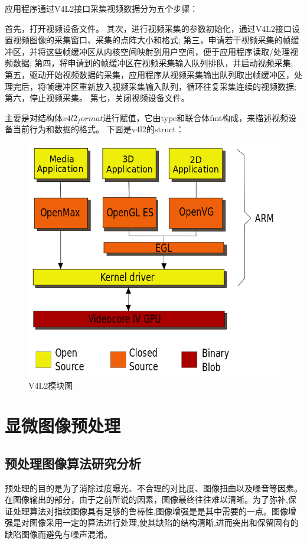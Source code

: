应用程序通过V4L2接口采集视频数据分为五个步骤：

首先，打开视频设备文件。
其次，进行视频采集的参数初始化，通过V4L2接口设置视频图像的采集窗口、采集的点阵大小和格式;
第三，申请若干视频采集的帧缓冲区，并将这些帧缓冲区从内核空间映射到用户空间，便于应用程序读取/处理视频数据;
第四，将申请到的帧缓冲区在视频采集输入队列排队，并启动视频采集;
第五，驱动开始视频数据的采集，应用程序从视频采集输出队列取出帧缓冲区，处理完后，将帧缓冲区重新放入视频采集输入队列，循环往复采集连续的视频数据;
第六，停止视频采集。
第七，关闭视频设备文件。

主要是对结构体$v4l2_format$进行赋值，它由type和联合体fmt构成，来描述视频设备当前行为和数据的格式。
下面是v4l2的struct：

%

\begin{figure}[h]
\centering
\includegraphics[width=0.7\linewidth]{Figure/V4L2}
\caption{V4L2模块图}
\label{fig:V4L2}
\end{figure}

\section{显微图像预处理}
\subsection{预处理图像算法研究分析}
预处理的目的是为了消除过度曝光、不合理的对比度、图像扭曲以及噪音等因素。在图像输出的部分，由于之前所说的因素，图像最终往往难以清晰。为了弥补,保证处理算法对指纹图像具有足够的鲁棒性,图像增强是是其中需要的一点。图像增强是对图像采用一定的算法进行处理,使其缺陷的结构清晰,进而突出和保留固有的缺陷图像而避免与噪声混淆。
